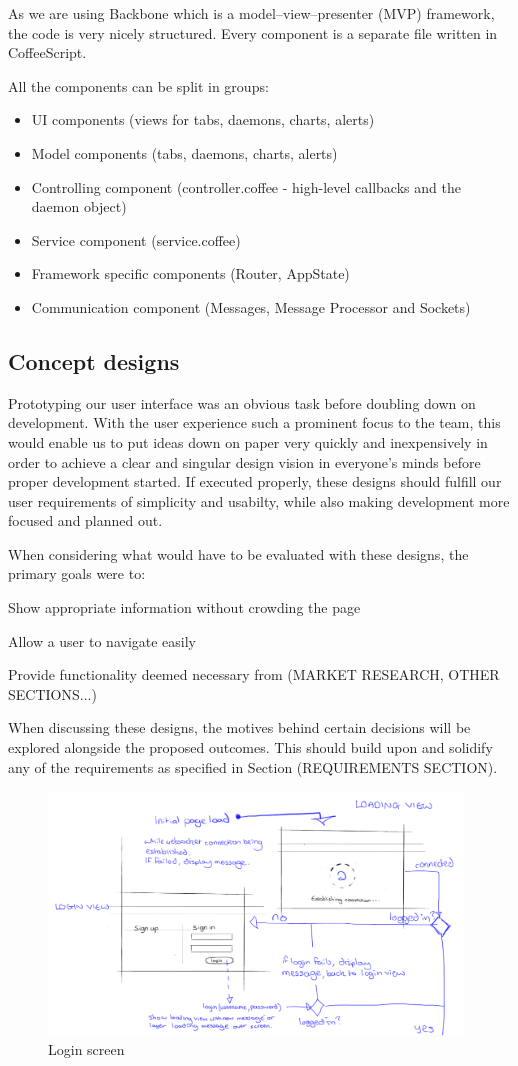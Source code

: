 \documentclass{l3proj}
\begin{document}
As we are using Backbone which is a model–view–presenter (MVP) framework, the code is very nicely structured. Every component is a separate file written in CoffeeScript.

All the components can be split in groups:
\begin{itemize}
  \item UI components (views for tabs, daemons, charts, alerts)
  \item Model components (tabs, daemons, charts, alerts)
  \item Controlling component (controller.coffee - high-level callbacks and the daemon object)
  \item Service component (service.coffee)
  \item Framework specific components (Router, AppState)
  \item Communication component (Messages, Message Processor and Sockets)
\end{itemize}

\subsection{Concept designs}

Prototyping our user interface was an obvious task before doubling down on development. With the user experience such a prominent focus to the team, this would enable us to put ideas down on paper very quickly and inexpensively in order to achieve a clear and singular design vision in everyone's minds before proper development started. If executed properly, these designs should fulfill our user requirements of simplicity and usabilty, while also making development more focused and planned out.

When considering what would have to be evaluated with these designs, the primary goals were to:

Show appropriate information without crowding the page

Allow a user to navigate easily

Provide functionality deemed necessary from (MARKET RESEARCH, OTHER SECTIONS...)

When discussing these designs, the motives behind certain decisions will be explored alongside the proposed outcomes. This should build upon and solidify any of the requirements as specified in Section (REQUIREMENTS SECTION).

\begin{figure}[H]
\centering
\includegraphics[width=110mm]{Concept_Designs/Login.png}
\caption{Login screen}
\label{fig:Login}
\end{figure}
\end{document}
